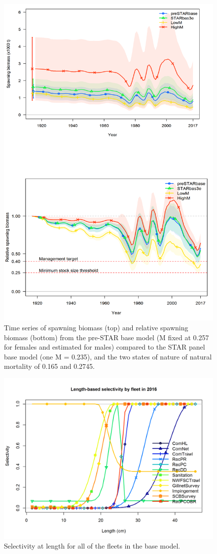 \documentclass[12pt,]{article}
\begin{document}
\begin{figure}[htbp]
\centering
\includegraphics[height=0.90000\textwidth]{Figures/Request12.png}
\caption{Time series of spawning biomass (top) and relative spawning
biomass (bottom) from the pre-STAR base model (M fixed at 0.257 for
females and estimated for males) compared to the STAR panel base model
(one M = 0.235), and the two states of nature of natural mortality of
0.165 and 0.2745. \label{fig:Request12}}
\end{figure}

\FloatBarrier

\FloatBarrier

\FloatBarrier

\begin{figure}[htbp]
\centering
\includegraphics{r4ss/plots_mod1/sel01_multiple_fleets_length1.png}
\caption{Selectivity at length for all of the fleets in the base model.
\label{fig:sel01_multiple_fleets_length1}}
\end{figure}
\end{document}
